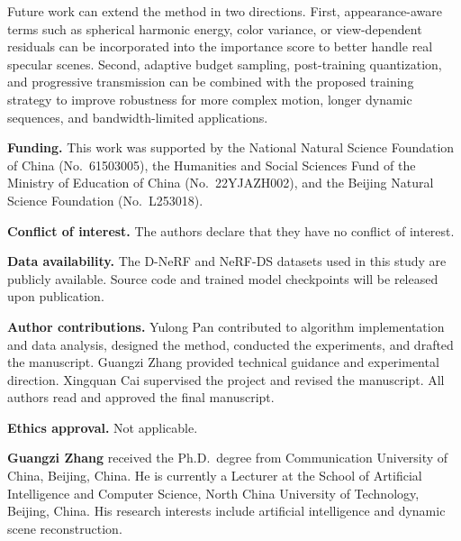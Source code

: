\documentclass[pdflatex,sn-mathphys]{sn-jnl}
\begin{document}
Future work can extend the method in two directions. First, appearance-aware terms such as spherical harmonic energy, color variance, or view-dependent residuals can be incorporated into the importance score to better handle real specular scenes. Second, adaptive budget sampling, post-training quantization, and progressive transmission can be combined with the proposed training strategy to improve robustness for more complex motion, longer dynamic sequences, and bandwidth-limited applications.


\textbf{Funding.} This work was supported by the National Natural Science Foundation of China (No.~61503005), the Humanities and Social Sciences Fund of the Ministry of Education of China (No.~22YJAZH002), and the Beijing Natural Science Foundation (No.~L253018).

\textbf{Conflict of interest.} The authors declare that they have no conflict of interest.

\textbf{Data availability.} The D-NeRF and NeRF-DS datasets used in this study are publicly available. Source code and trained model checkpoints will be released upon publication.

\textbf{Author contributions.} Yulong Pan contributed to algorithm implementation and data analysis, designed the method, conducted the experiments, and drafted the manuscript. Guangzi Zhang provided technical guidance and experimental direction. Xingquan Cai supervised the project and revised the manuscript. All authors read and approved the final manuscript.

\textbf{Ethics approval.} Not applicable.



\textbf{Guangzi Zhang}
received the Ph.D.~degree from Communication University of China, Beijing, China. He is currently a Lecturer at the School of Artificial Intelligence and Computer Science, North China University of Technology, Beijing, China. His research interests include artificial intelligence and dynamic scene reconstruction.

\end{document}
